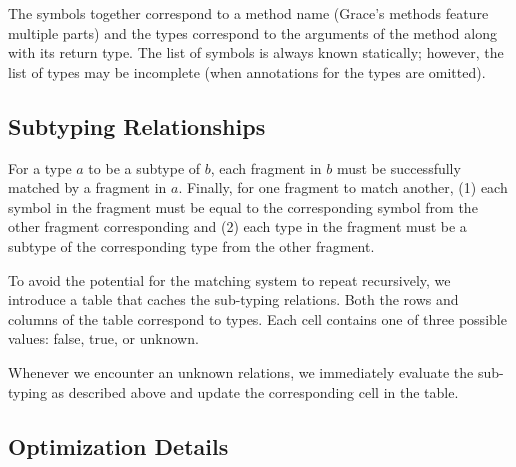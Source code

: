 The symbols together correspond to a method name (Grace's methods feature multiple parts) and the types correspond to the arguments of the method along with its return type. The list of symbols is always known statically; however, the list of types may be incomplete (when annotations for the types are omitted).

\subsection{Subtyping Relationships}
\label{ssec:subtyping-relationships}

For a type $a$ to be a subtype of $b$, each fragment in $b$ must be successfully matched by a fragment in $a$. Finally, for one fragment to match another, (1) each symbol in the fragment must be equal to the corresponding symbol from the other fragment corresponding and (2) each type in the fragment must be a subtype of the corresponding type from the other fragment. 

To avoid the potential for the matching system to repeat recursively, we introduce a table that caches the sub-typing relations. Both the rows and columns of the table correspond to types. Each cell contains one of three possible values: false, true, or unknown. 

Whenever we encounter an unknown relations, we immediately evaluate the sub-typing as described above and update the corresponding cell in the table.

\subsection{Optimization Details}
\label{ssec:optimization-details}


